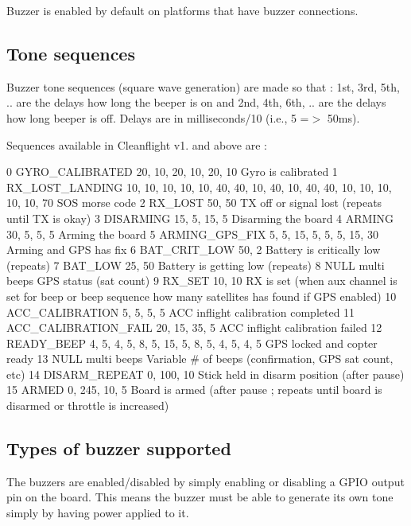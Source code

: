 Buzzer is enabled by default on platforms that have buzzer connections.

\subsection*{Tone sequences}

Buzzer tone sequences (square wave generation) are made so that \+: 1st, 3rd, 5th, .. are the delays how long the beeper is on and 2nd, 4th, 6th, .. are the delays how long beeper is off. Delays are in milliseconds/10 (i.\+e., 5 =$>$ 50ms).

Sequences available in Cleanflight v1. and above are \+: \begin{DoxyVerb}0    GYRO_CALIBRATED       20, 10, 20, 10, 20, 10   Gyro is calibrated
1    RX_LOST_LANDING       10, 10, 10, 10, 10, 40, 40, 10, 40, 10, 40, 40, 10, 10, 10, 10, 10, 70    SOS morse code
2    RX_LOST               50, 50       TX off or signal lost (repeats until TX is okay)
3    DISARMING             15, 5, 15, 5     Disarming the board
4    ARMING                30, 5, 5, 5      Arming the board
5    ARMING_GPS_FIX        5, 5, 15, 5, 5, 5, 15, 30    Arming and GPS has fix
6    BAT_CRIT_LOW          50, 2        Battery is critically low (repeats)
7    BAT_LOW               25, 50       Battery is getting low (repeats) 
8    NULL                  multi beeps      GPS status (sat count)
9    RX_SET                10, 10       RX is set (when aux channel is set for beep or beep sequence how many satellites has found if GPS enabled)
10   ACC_CALIBRATION       5, 5, 5, 5       ACC inflight calibration completed
11   ACC_CALIBRATION_FAIL  20, 15, 35, 5    ACC inflight calibration failed
12   READY_BEEP            4, 5, 4, 5, 8, 5, 15, 5, 8, 5, 4, 5, 4, 5    GPS locked and copter ready   
13   NULL                  multi beeps      Variable # of beeps (confirmation, GPS sat count, etc)
14   DISARM_REPEAT         0, 100, 10       Stick held in disarm position (after pause)
15   ARMED                 0, 245, 10, 5    Board is armed (after pause ; repeats until board is disarmed or throttle is increased)
\end{DoxyVerb}


\subsection*{Types of buzzer supported}

The buzzers are enabled/disabled by simply enabling or disabling a G\+P\+I\+O output pin on the board. This means the buzzer must be able to generate its own tone simply by having power applied to it.

